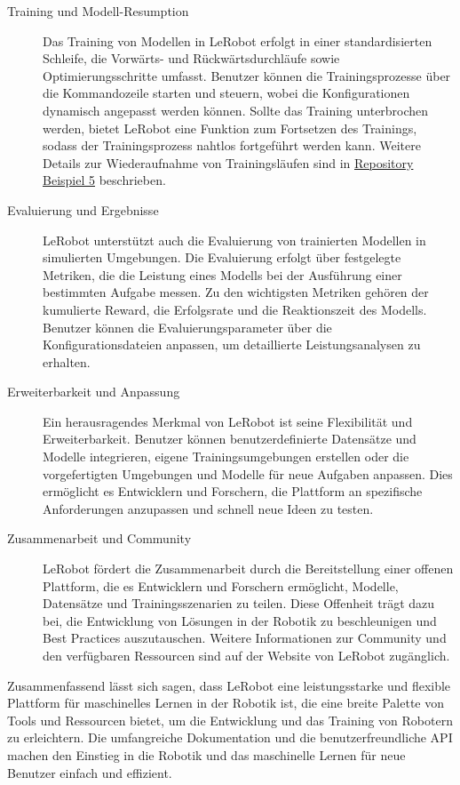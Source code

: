 \documentclass[a4paper, 12pt]{article}
\begin{document}
\begin{description}
	\item[Training und Modell-Resumption] Das Training von Modellen in LeRobot erfolgt in einer standardisierten Schleife, die Vorwärts- und Rückwärtsdurchläufe sowie Optimierungsschritte umfasst. Benutzer können die Trainingsprozesse über die Kommandozeile starten und steuern, wobei die Konfigurationen dynamisch angepasst werden können. Sollte das Training unterbrochen werden, bietet LeRobot eine Funktion zum Fortsetzen des Trainings, sodass der Trainingsprozess nahtlos fortgeführt werden kann. Weitere Details zur Wiederaufnahme von Trainingsläufen sind in \href{https://github.com/huggingface/lerobot/blob/main/examples/5_resume_training.md}{Repository Beispiel 5} beschrieben.

	\item[Evaluierung und Ergebnisse] LeRobot unterstützt auch die Evaluierung von trainierten Modellen in simulierten Umgebungen. Die Evaluierung erfolgt über festgelegte Metriken, die die Leistung eines Modells bei der Ausführung einer bestimmten Aufgabe messen. Zu den wichtigsten Metriken gehören der kumulierte Reward, die Erfolgsrate und die Reaktionszeit des Modells. Benutzer können die Evaluierungsparameter über die Konfigurationsdateien anpassen, um detaillierte Leistungsanalysen zu erhalten.

	\item[Erweiterbarkeit und Anpassung] Ein herausragendes Merkmal von LeRobot ist seine Flexibilität und Erweiterbarkeit. Benutzer können benutzerdefinierte Datensätze und Modelle integrieren, eigene Trainingsumgebungen erstellen oder die vorgefertigten Umgebungen und Modelle für neue Aufgaben anpassen. Dies ermöglicht es Entwicklern und Forschern, die Plattform an spezifische Anforderungen anzupassen und schnell neue Ideen zu testen.

	\item[Zusammenarbeit und Community] LeRobot fördert die Zusammenarbeit durch die Bereitstellung einer offenen Plattform, die es Entwicklern und Forschern ermöglicht, Modelle, Datensätze und Trainingsszenarien zu teilen. Diese Offenheit trägt dazu bei, die Entwicklung von Lösungen in der Robotik zu beschleunigen und Best Practices auszutauschen. Weitere Informationen zur Community und den verfügbaren Ressourcen sind auf der Website von LeRobot zugänglich.

\end{description}

Zusammenfassend lässt sich sagen, dass LeRobot eine leistungsstarke und flexible Plattform für maschinelles Lernen in der Robotik ist, die eine breite Palette von Tools und Ressourcen bietet, um die Entwicklung und das Training von Robotern zu erleichtern. Die umfangreiche Dokumentation und die benutzerfreundliche API machen den Einstieg in die Robotik und das maschinelle Lernen für neue Benutzer einfach und effizient.
\end{document}
